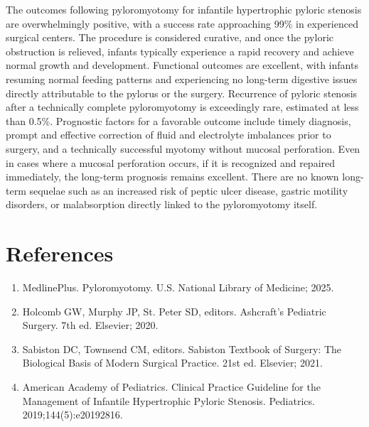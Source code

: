 The outcomes following pyloromyotomy for infantile hypertrophic pyloric stenosis are overwhelmingly positive, with a success rate approaching 99\% in experienced surgical centers. The procedure is considered curative, and once the pyloric obstruction is relieved, infants typically experience a rapid recovery and achieve normal growth and development. Functional outcomes are excellent, with infants resuming normal feeding patterns and experiencing no long-term digestive issues directly attributable to the pylorus or the surgery. Recurrence of pyloric stenosis after a technically complete pyloromyotomy is exceedingly rare, estimated at less than 0.5\%. Prognostic factors for a favorable outcome include timely diagnosis, prompt and effective correction of fluid and electrolyte imbalances prior to surgery, and a technically successful myotomy without mucosal perforation. Even in cases where a mucosal perforation occurs, if it is recognized and repaired immediately, the long-term prognosis remains excellent. There are no known long-term sequelae such as an increased risk of peptic ulcer disease, gastric motility disorders, or malabsorption directly linked to the pyloromyotomy itself.

\section*{References}
\begin{enumerate}
  \item MedlinePlus. Pyloromyotomy. U.S. National Library of Medicine; 2025.
  \item Holcomb GW, Murphy JP, St. Peter SD, editors. Ashcraft's Pediatric Surgery. 7th ed. Elsevier; 2020.
  \item Sabiston DC, Townsend CM, editors. Sabiston Textbook of Surgery: The Biological Basis of Modern Surgical Practice. 21st ed. Elsevier; 2021.
  \item American Academy of Pediatrics. Clinical Practice Guideline for the Management of Infantile Hypertrophic Pyloric Stenosis. Pediatrics. 2019;144(5):e20192816.
\end{enumerate}

\clearpage
